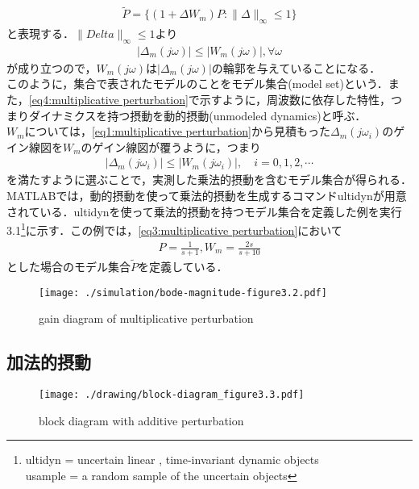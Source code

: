 \documentclass[a4paper,11pt,uplatex]{jsarticle} %
\theoremstyle{definition}	%
\begin{document}
{\begin{align}
\tilde{P} = \{(1 + \Delta W_m)P: \| \Delta \|_\infty \leq 1\}
\end{align}
と表現する．$\|Delta \|_\infty \leq 1$より
\begin{align}
\label{eq6:multiplicative perturbation}
| \Delta_m(j\omega) | \leq | W_m (j\omega) |, \forall \omega
\end{align}
が成り立つので，$W_m(j\omega)$は$|\Delta_m (j\omega) |$の輪郭を与えていることになる．\\
このように，集合で表されたモデルのことをモデル集合(model set)という．また，\eqref{eq4:multiplicative perturbation}で示すように，周波数に依存した特性，つまりダイナミクスを持つ摂動を動的摂動(unmodeled dynamics)と呼ぶ．\\
$W_m$については，\eqref{eq1:multiplicative perturbation}から見積もった$\Delta_m (j\omega_i)$のゲイン線図を$W_m$のゲイン線図が覆うように，つまり
\begin{align}
\label{eq7:multiplicative perturbation}
| \Delta_m (j\omega_i) | \leq | W_m(j\omega_i) |, \quad  i = 0,1,2,\cdots
\end{align}
を満たすように選ぶことで，実測した乗法的摂動を含むモデル集合が得られる．\\
MATLABでは，動的摂動を使って乗法的摂動を生成するコマンドultidynが用意されている．ultidynを使って乗法的摂動を持つモデル集合を定義した例を実行3.1\footnote{ultidyn = uncertain linear , time-invariant dynamic objects \\usample = a random sample of the uncertain objects }に示す．この例では，\eqref{eq3:multiplicative perturbation}において
\begin{align}
\label{tf:action 3.1}
P = \frac{1}{s + 1} , W_m = \frac{2s}{s + 10}
\end{align}
とした場合のモデル集合$\tilde{P}$を定義している．



\begin{figure}[t]
\centering
\texttt{[image: ./simulation/bode-magnitude-figure3.2.pdf]}
\caption{gain diagram of multiplicative perturbation }
\label{fig:gain diagram of multiplicative perturbation}
\end{figure}

\subsection{加法的摂動}
\begin{figure}[h]
\centering
\texttt{[image: ./drawing/block-diagram\_figure3.3.pdf]}
\caption{block diagram with additive perturbation}
\label{fig:block diagram of fig 3.3}
\end{figure}

}
\end{document}
